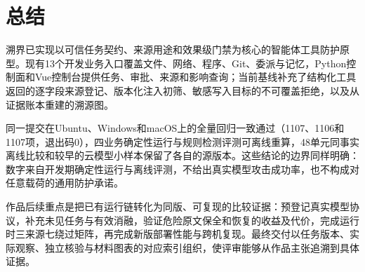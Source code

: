 \chapter{总结}
溯界已实现以可信任务契约、来源用途和效果级门禁为核心的智能体工具防护原型。现有13个开发业务入口覆盖文件、网络、程序、Git、委派与记忆，Python控制面和Vue控制台提供任务、审批、来源和影响查询；当前基线补充了结构化工具返回的逐字段来源登记、版本化注入初筛、敏感写入目标的不可覆盖拒绝，以及从证据账本重建的溯源图。

同一提交在Ubuntu、Windows和macOS上的全量回归一致通过（1107、1106和1107项，退出码0），四业务确定性运行与规则检测评测可离线重算，48单元同事实离线比较和较早的云模型小样本保留了各自的源版本。这些结论的边界同样明确：数字来自开发期确定性运行与离线评测，不给出真实模型攻击成功率，也不构成对任意载荷的通用防护承诺。

作品后续重点是把已有运行链转化为同版、可复现的比较证据：预登记真实模型协议，补充未见任务与有效消融，验证危险原文保全和恢复的收益及代价，完成运行时三来源七绕过矩阵，再完成新版部署性能与跨机复现。最终交付以任务版本、实际观察、独立核验与材料图表的对应索引组织，使评审能够从作品主张追溯到具体证据。
